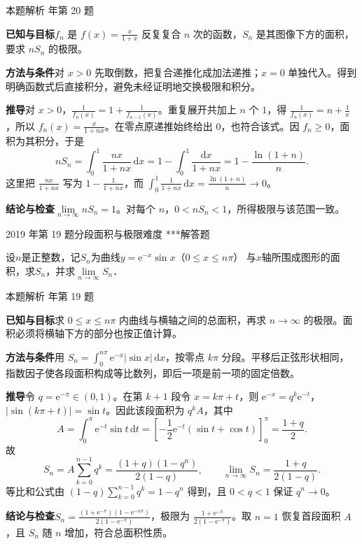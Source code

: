 \documentclass[UTF8,zihao=-4,fontset=fandol]{ctexart}
\renewcommand{\lim}{\operatorname*{lim}\limits}
\newcounter{BankQuestion}
\newcommand{\QuestionPage}[7]{%
  \stepcounter{BankQuestion}%
  \par\noindent\begin{minipage}{\linewidth}
  \raggedright
  {\small\textcolor{black!60}{#3\quad #5\quad 难度 #7}\hfill\textcolor{accent}{#2}}\par\smallskip}
\newcommand{\QuestionEnd}{\end{minipage}\par\medskip}
\newcommand{\QuestionPage}[7]{%
  \clearpage
  \stepcounter{BankQuestion}%
  {\small\textcolor{accent}{#1\hfill #2}}\par\medskip
  {\small\textcolor{black!60}{#3\quad #5\quad 难度 #7\hfill \arabic{BankQuestion} / 234}}\par\vspace{9bp}}
\newcommand{\QuestionEnd}{}
\newenvironment{QuestionSolution}[1]{%
  \clearpage
  {\small\textcolor{black!60}{本题解析\quad #1}}\par\medskip
}{\par\clearpage}
\begin{document}
\begin{QuestionSolution}{2014 年第 20 题}
\textbf{已知与目标}\quad \(f_n\) 是 \(f(x)=\frac{x}{1+x}\) 反复复合 \(n\) 次的函数，\(S_n\) 是其图像下方的面积，要求 \(nS_n\) 的极限。

\textbf{方法与条件}\quad 对 \(x>0\) 先取倒数，把复合递推化成加法递推；\(x=0\) 单独代入。得到明确函数式后直接积分，避免未经证明地交换极限和积分。

\textbf{推导}\quad 对 \(x>0\)，\(\frac{1}{f_n(x)}=1+\frac{1}{f_{n-1}(x)}\)。重复展开共加上 \(n\) 个 \(1\)，得 \(\frac{1}{f_n(x)}=n+\frac{1}{x}\)，所以 \(f_n(x)=\frac{x}{1+nx}\)。在零点原递推始终给出 \(0\)，也符合该式。因 \(f_n\ge0\)，面积为其积分，于是
\[
nS_n=\int_0^1\frac{nx}{1+nx}\,\mathrm{d}x
=1-\int_0^1\frac{\mathrm{d}x}{1+nx}
=1-\frac{\ln(1+n)}{n}.
\]
这里把 \(\frac{nx}{1+nx}\) 写为 \(1-\frac{1}{1+nx}\)，而 \(\int_0^1\frac{1}{1+nx}\,\mathrm{d}x=\frac{\ln(1+n)}{n}\to0\)。

\textbf{结论与检查}\quad \(\boxed{\lim_{n\to\infty}nS_n=1}\)。对每个 \(n\)，\(0<nS_n<1\)，所得极限与该范围一致。
\end{QuestionSolution}

\QuestionPage{3.4 定积分的应用}{解答题}{2019 年第 19 题}{3}{分段面积与极限}{183 / 234}{***}
设$n$是正整数，记$S_n$为曲线$y = \mathrm{e}^{- x}\sin x$（$0 \le x \le n\pi$）
与$x$轴所围成图形的面积，求$S_n$，并求$\lim_{n \to \infty} S_n$．
\QuestionEnd

\begin{QuestionSolution}{2019 年第 19 题}
\textbf{已知与目标}\quad 求 \(0\le x\le n\pi\) 内曲线与横轴之间的总面积，再求 \(n\to\infty\) 的极限。面积必须将横轴下方的部分也按正值计算。

\textbf{方法与条件}\quad 用 \(S_n=\int_0^{n\pi}\mathrm{e}^{-x}|\sin x|\,\mathrm{d}x\)，按零点 \(k\pi\) 分段。平移后正弦形状相同，指数因子使各段面积构成等比数列，即后一项是前一项的固定倍数。

\textbf{推导}\quad 令 \(q=\mathrm{e}^{-\pi}\in(0,1)\)。在第 \(k+1\) 段令 \(x=k\pi+t\)，则 \(\mathrm{e}^{-x}=q^k\mathrm{e}^{-t}\)，\(|\sin(k\pi+t)|=\sin t\)。因此该段面积为 \(q^kA\)，其中
\[
A=\int_0^\pi \mathrm{e}^{-t}\sin t\,\mathrm{d}t
=\left[-\frac12 \mathrm{e}^{-t}(\sin t+\cos t)\right]_0^\pi
=\frac{1+q}{2}.
\]
故
\[
S_n=A\sum_{k=0}^{n-1}q^k
=\boxed{\frac{(1+q)(1-q^n)}{2(1-q)}},
\qquad
\lim_{n\to\infty}S_n=\boxed{\frac{1+q}{2(1-q)}}.
\]
等比和公式由 \((1-q)\sum_{k=0}^{n-1}q^k=1-q^n\) 得到，且 \(0<q<1\) 保证 \(q^n\to0\)。

\textbf{结论与检查}\quad \(\boxed{S_n=\frac{(1+\mathrm{e}^{-\pi})(1-\mathrm{e}^{-n\pi})}{2(1-\mathrm{e}^{-\pi})}}\)，极限为 \(\boxed{\frac{1+\mathrm{e}^{-\pi}}{2(1-\mathrm{e}^{-\pi})}}\)。取 \(n=1\) 恢复首段面积 \(A\)，且 \(S_n\) 随 \(n\) 增加，符合总面积性质。
\end{QuestionSolution}
\end{document}
